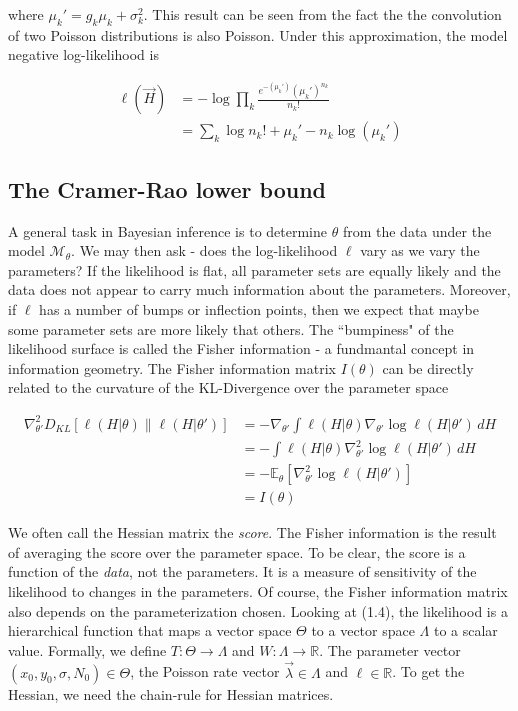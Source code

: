 \documentclass{ucetd}
\begin{document}
where $\mu_{k}' = g_{k}\mu_{k} + \sigma_{k}^{2}$. This result can be seen from the fact the the convolution of two Poisson distributions is also Poisson. Under this approximation, the model negative log-likelihood is

\begin{align*}
\ell(\vec{H}) &= -\log \prod_{k} \frac{e^{-\left(\mu_{k}'\right)}\left(\mu_{k}'\right)^{n_{k}}}{n_{k}!}\\
&= \sum_{k}  \log n_{k}! + \mu_{k}' - n_{k}\log\left(\mu_{k}'\right)
\end{align*}



\subsection{The Cramer-Rao lower bound}

A general task in Bayesian inference is to determine $\theta$ from the data under the model $\mathcal{M}_{\theta}$. We may then ask - does the log-likelihood $\ell$ vary as we vary the parameters? If the likelihood is flat, all parameter sets are equally likely and the data does not appear to carry much information about the parameters. Moreover, if $\ell$ has a number of bumps or inflection points, then we expect that maybe some parameter sets are more likely that others. The ``bumpiness" of the likelihood surface is called the Fisher information - a fundmantal concept in information geometry. The Fisher information matrix $I(\theta)$ can be directly related to the curvature of the KL-Divergence over the parameter space

\begin{align*}
\nabla^2_{\theta'} D_{KL}[\ell(H|\theta) \parallel \ell(H|\theta')] 
&= - \nabla_{\theta'} \int \ell(H|\theta) \nabla_{\theta'}  \log \ell(H|\theta') \, dH \\ 
&= - \int \ell(H|\theta) \nabla^2_{\theta'}  \log \ell(H|\theta') \, dH \\
&= - \mathbb{E}_{\theta}[\nabla^2_{\theta'} \log \ell(H|\theta')] \\
&= I(\theta)
\end{align*}


We often call the Hessian matrix the \emph{score}. The Fisher information is the result of averaging the score over the parameter space. To be clear, the score is a function of the \emph{data}, not the parameters. It is a measure of sensitivity of the likelihood to changes in the parameters. Of course, the Fisher information matrix also depends on the parameterization chosen. Looking at (1.4), the likelihood is a hierarchical function that maps a vector space $\Theta$ to a vector space $\Lambda$ to a scalar value. Formally, we define $T: \Theta \rightarrow \Lambda$ and $W: \Lambda \rightarrow \mathbb{R}$. The parameter vector $(x_{0},y_{0},\sigma, N_{0})\in \Theta$, the Poisson rate vector $\vec{\lambda} \in \Lambda$ and $\ell \in \mathbb{R}$. To get the Hessian, we need the chain-rule for Hessian matrices.
\end{document}
